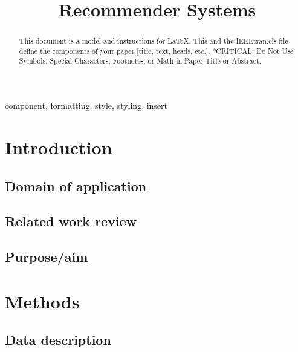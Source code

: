 \documentclass[conference]{IEEEtran}
\begin{document}
\title{Recommender Systems}

\author{

}

\maketitle

\begin{abstract}
    This document is a model and instructions for \LaTeX.
    This and the IEEEtran.cls file define the components of your paper [title, text, heads, etc.]. *CRITICAL: Do Not Use Symbols, Special Characters, Footnotes,
    or Math in Paper Title or Abstract.
\end{abstract}

\begin{IEEEkeywords}
    component, formatting, style, styling, insert
\end{IEEEkeywords}

\section{Introduction}

\subsection{Domain of application}

\subsection{Related work review}

\subsection{Purpose/aim}


\section{Methods}

\subsection{Data description}
\end{document}
